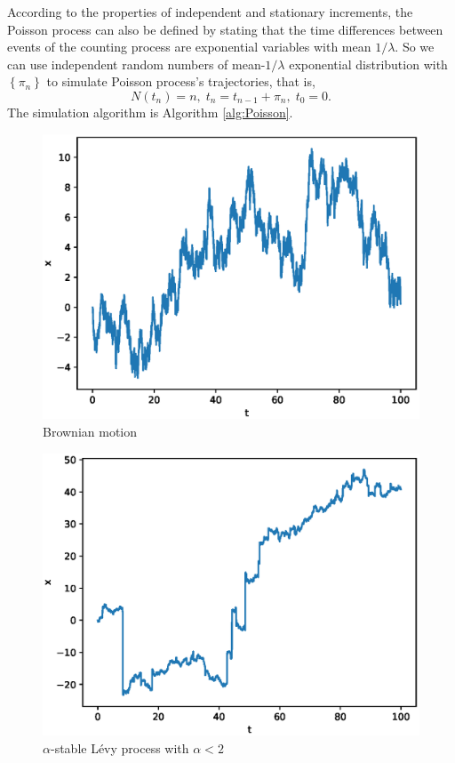 \documentclass[aps, pre, preprint, amsmath, amssymb]{revtex4}
\newcommand{\dakuo}[1]{\left\{#1\right\}}
\begin{document}
According to the properties of independent and stationary increments, the Poisson process can also be defined by stating that the time differences between events of the counting process are exponential variables with mean $1/\lambda$. So we can use independent random numbers of mean-$1/\lambda$ exponential distribution with  $\dakuo{\pi_n}$ to simulate Poisson process's trajectories, that is, 
\begin{equation}\label{eq:poisson}
	N(t_n)=n,\; t_n = t_{n-1} + \pi_n,\; t_0 = 0.
\end{equation}
The simulation algorithm is Algorithm \ref{alg:Poisson}.
\begin{figure}[H]
\centering
\includegraphics[scale=0.5]{figures/brown}
\caption{Brownian motion}
\end{figure}
\begin{figure}[H]
\centering
\includegraphics[scale=0.5]{figures/levy}
\caption{$\alpha$-stable L\'{e}vy process with $\alpha<2$}
\end{figure}
\end{document}
